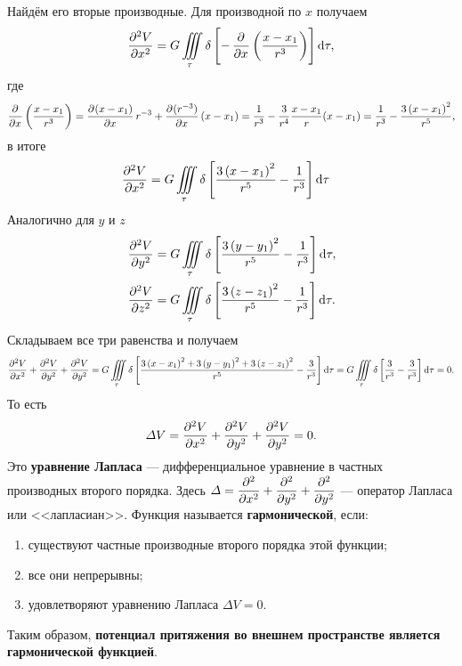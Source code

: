\documentclass[11pt, a4paper]{article}
\theoremstyle{plain}
\theoremstyle{definition}
\theoremstyle{remark}
\begin{document}
Найдём его вторые производные. Для производной по $x$ получаем
\begin{equation*}
	 \dpd[2]{V}{x} = G\iiint\limits_{\tau} \delta \left[ - \dpd{}{x} \left(\dfrac{x-x_1}{r^3} \right)\right] \dif \tau,
\end{equation*}
где
\begin{equation*}
	\dpd{}{x} \left(\dfrac{x-x_1}{r^3} \right) = \dpd{(x-x_1)}{x} r^{-3} + \dpd{(r^{-3})}{x} (x-x_1) = \dfrac{1}{r^3} - \dfrac{3}{r^4} \dfrac{x-x_1}{r} (x-x_1) = \dfrac{1}{r^3} - \dfrac{3 \left(x-x_1 \right)^2}{r^5},
\end{equation*}
в итоге
\begin{align*}
    &\dpd[2]{V}{x} = G\iiint\limits_{\tau} \delta \left[ \dfrac{3 \left( x - x_1 \right)^2}{r^5} - \dfrac{1}{r^3} \right]\dif\tau
\end{align*}
Аналогично для $y$ и $z$
\begin{align*}
    &\dpd[2]{V}{y} = G\iiint\limits_{\tau} \delta \left[ \dfrac{3 \left( y - y_1 \right)^2}{r^5} -
    \dfrac{1}{r^3} \right]\dif\tau, \\
    &\dpd[2]{V}{z} = G\iiint\limits_{\tau} \delta \left[ \dfrac{3 \left( z - z_1 \right)^2}{r^5} -
    \dfrac{1}{r^3} \right]\dif\tau.
\end{align*}
Складываем все три равенства и получаем
\begin{equation*}
    \dpd[2]{V}{x} + \dpd[2]{V}{y} + \dpd[2]{V}{y} = 
    G\iiint\limits_{\tau} \delta \left[ \dfrac{3 \left( x - x_1 \right)^2 +
        3 \left( y - y_1 \right)^2 +3 \left( z - z_1 \right)^2}{r^5} - \dfrac{3}{r^3} 
    \right]\dif\tau =
    G\iiint\limits_{\tau} \delta \left[ \dfrac{3}{r^3} - \dfrac{3}{r^3} \right]\dif\tau = 0.
\end{equation*}
То есть
\begin{equation*}
    \Delta V = \dpd[2]{V}{x} + \dpd[2]{V}{y} + \dpd[2]{V}{y} = 0.
\end{equation*}
Это \textbf{уравнение Лапласа} --- дифференциальное уравнение в частных производных второго порядка. Здесь
$\Delta = \dpd[2]{}{x} + \dpd[2]{}{y} + \dpd[2]{}{y}$ --- оператор Лапласа или <<лапласиан>>.
Функция называется \textbf{гармонической}, если:
\begin{enumerate}
	\item существуют частные производные второго порядка этой функции;
	\item все они непрерывны;
	\item удовлетворяют уравнению Лапласа $\Delta V = 0$.
\end{enumerate}
Таким образом, \textbf{потенциал притяжения во внешнем пространстве является гармонической функцией}.
\end{document}
